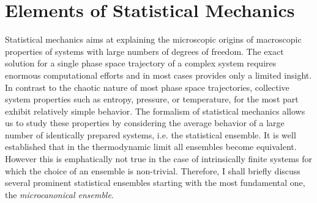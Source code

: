 \documentclass[12pt]{report}
\begin{document}
\chapter{Elements of Statistical Mechanics}
Statistical mechanics aims at explaining the microscopic origins of macroscopic properties of systems with large numbers of degrees of freedom. The exact solution for a single phase space trajectory of a complex system requires enormous computational efforts and in most cases provides only a limited insight. In contrast to the chaotic nature of most phase space trajectories, collective system properties such as entropy, pressure, or temperature, for the most part exhibit relatively simple behavior. The formalism of statistical mechanics allows us to study these properties by considering the average behavior of a large number of identically prepared systems, i.e. the statistical ensemble. It is well established that in the thermodynamic limit all ensembles become equivalent. However this is emphatically not true in the case of intrinsically finite systems for which the choice of an ensemble is non-trivial. Therefore, I shall briefly discuss several prominent statistical ensembles starting with the most fundamental one, the \textit{microcanonical ensemble}.
\end{document}
